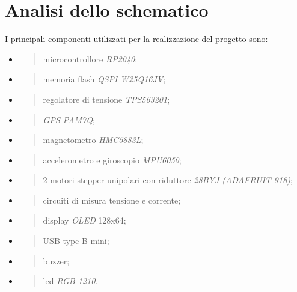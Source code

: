 \chapter{Analisi dello schematico}

I principali componenti utilizzati per la realizzazione del progetto
sono:

\begin{itemize}
\item
  \begin{quote}
  microcontrollore \emph{RP2040};
  \end{quote}
\item
  \begin{quote}
  memoria flash \emph{QSPI} \emph{W25Q16JV};
  \end{quote}
\item
  \begin{quote}
  regolatore di tensione \emph{TPS563201};
  \end{quote}
\item
  \begin{quote}
  \emph{GPS PAM7Q};
  \end{quote}
\item
  \begin{quote}
  magnetometro \emph{HMC5883L};
  \end{quote}
\item
  \begin{quote}
  accelerometro e giroscopio \emph{MPU6050};
  \end{quote}
\item
  \begin{quote}
  2 motori stepper unipolari con riduttore \emph{28BYJ (ADAFRUIT 918)};
  \end{quote}
\item
  \begin{quote}
  circuiti di misura tensione e corrente;
  \end{quote}
\item
  \begin{quote}
  display \emph{OLED} 128x64;
  \end{quote}
\item
  \begin{quote}
  USB type B-mini;
  \end{quote}
\item
  \begin{quote}
  buzzer;
  \end{quote}
\item
  \begin{quote}
  led \emph{RGB 1210}.
  \end{quote}
\end{itemize}

